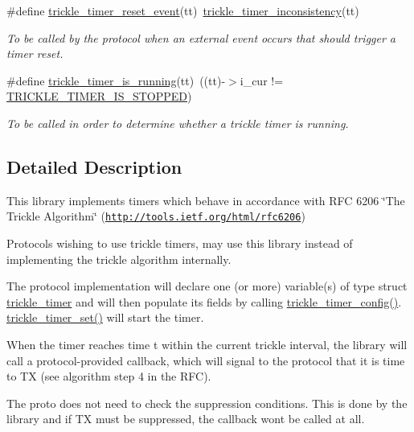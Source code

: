 \begin{DoxyCompactItemize}
\#define \hyperlink{group__trickle-timer_ga3795c2533ccbd951226385e9b8f30f09}{trickle\+\_\+timer\+\_\+reset\+\_\+event}(tt)~\hyperlink{group__trickle-timer_gae401435f40030c5c4f0f49e813fd9afc}{trickle\+\_\+timer\+\_\+inconsistency}(tt)
\begin{DoxyCompactList}\small\item\em To be called by the protocol when an external event occurs that should trigger a timer reset. \end{DoxyCompactList}\item 
\#define \hyperlink{group__trickle-timer_ga584276a4a8fdcdaf58aa9406e5214591}{trickle\+\_\+timer\+\_\+is\+\_\+running}(tt)~((tt)-\/$>$i\+\_\+cur != \hyperlink{group__trickle-timer_ga46a9d1ac6e07dc96cfd6224b873333ca}{T\+R\+I\+C\+K\+L\+E\+\_\+\+T\+I\+M\+E\+R\+\_\+\+I\+S\+\_\+\+S\+T\+O\+P\+P\+E\+D})
\begin{DoxyCompactList}\small\item\em To be called in order to determine whether a trickle timer is running. \end{DoxyCompactList}\end{DoxyCompactItemize}


\subsection{Detailed Description}
This library implements timers which behave in accordance with R\+F\+C 6206 \char`\"{}\+The Trickle Algorithm\char`\"{} (\href{http://tools.ietf.org/html/rfc6206}{\tt http\+://tools.\+ietf.\+org/html/rfc6206})

Protocols wishing to use trickle timers, may use this library instead of implementing the trickle algorithm internally.

The protocol implementation will declare one (or more) variable(s) of type struct \hyperlink{structtrickle__timer}{trickle\+\_\+timer} and will then populate its fields by calling \hyperlink{group__trickle-timer_ga4b21d9fbed3c0c903fa1687b812a7f9c}{trickle\+\_\+timer\+\_\+config()}. \hyperlink{group__trickle-timer_ga57b03043f109c0b2adb1dc92637ee8b4}{trickle\+\_\+timer\+\_\+set()} will start the timer.

When the timer reaches time t within the current trickle interval, the library will call a protocol-\/provided callback, which will signal to the protocol that it is time to T\+X (see algorithm step 4 in the R\+F\+C).

The proto does not need to check the suppression conditions. This is done by the library and if T\+X must be suppressed, the callback won\textquotesingle{}t be called at all.

